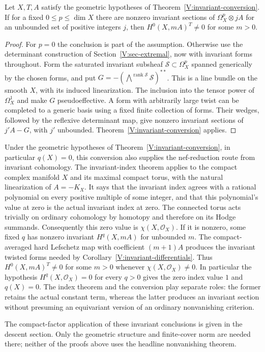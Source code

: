 \begin{corollary}\label{V:invariant-differentials}
Let $X,T,A$ satisfy the geometric hypotheses of
Theorem~\ref{V:invariant-conversion}.  If for a fixed
$0\le p\le\dim X$ there are nonzero invariant sections of
$\Omega_X^p\otimes jA$ for an unbounded set of positive integers
$j$, then $H^0(X,mA)^T\ne0$ for some $m>0$.
\end{corollary}

\begin{proof}
For $p=0$ the conclusion is part of the assumption.  Otherwise use
the determinant construction of Section~\ref{V:sec-extremal}, now
with invariant forms throughout.  Form
the saturated invariant subsheaf $\mathcal S\subset\Omega_X^p$
spanned generically by the chosen forms, and put
$G=-(\bigwedge^{\operatorname{rank}\mathcal S}\mathcal S)^{**}$.
This is a line bundle on the smooth $X$, with its induced
linearization.  The inclusion into the tensor power of $\Omega_X^1$
and \cite[Theorem~4.1]{LMPTX2023} make $G$ pseudoeffective.
A form with arbitrarily large twist can be completed to a generic
basis using a fixed finite collection of forms.  Their wedges,
followed by the reflexive determinant map, give nonzero invariant
sections of $j'A-G$, with $j'$ unbounded.  Theorem~\ref{V:invariant-conversion}
applies.
\end{proof}

\begin{remark}\label{V:invariant-index-application}
Under the geometric hypotheses of Theorem~\ref{V:invariant-conversion},
in particular $q(X)=0$, this conversion also supplies the nef-reduction
route from invariant cohomology.  The invariant-index theorem
\cite[Theorem \textup{(Invariant anticanonical index)}]{CompanionI} applies to the compact
complex manifold $X$ and its maximal compact torus, with the natural
linearization of $A=-K_X$.  It says that the invariant index agrees
with a rational polynomial on every positive multiple of some
integer, and that this polynomial's value at zero is the actual
invariant index at zero.  The connected torus acts trivially on
ordinary cohomology by homotopy and therefore on its Hodge summands.
Consequently this zero value is $\chi(X,\mathcal O_X)$.  If it is nonzero,
some fixed $q$ has nonzero invariant $H^q(X,mA)$ for unbounded $m$.
The compact-averaged hard Lefschetz map with coefficient $(m+1)A$
produces the invariant twisted forms needed by
Corollary~\ref{V:invariant-differentials}.  Thus
$H^0(X,mA)^T\ne0$ for some $m>0$ whenever
$\chi(X,\mathcal O_X)\ne0$.  In particular the hypothesis $H^q(X,\mathcal O_X)=0$ for every $q>0$ gives the zero
index value $1$ and $q(X)=0$.  The index theorem and the conversion
play separate roles: the former retains the actual constant term,
whereas the latter produces an invariant section without presuming
an equivariant version of an ordinary nonvanishing criterion.
\end{remark}

The compact-factor application of these invariant conclusions is
given in the descent section.  Only the geometric structure and
finite-cover norm are needed there; neither of the proofs above
uses the headline nonvanishing theorem.
